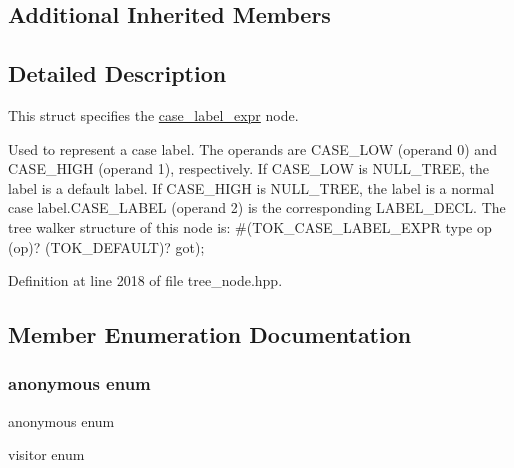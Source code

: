 \subsection*{Additional Inherited Members}


\subsection{Detailed Description}
This struct specifies the \hyperlink{structcase__label__expr}{case\+\_\+label\+\_\+expr} node. 

Used to represent a case label. The operands are C\+A\+S\+E\+\_\+\+L\+OW (operand 0) and C\+A\+S\+E\+\_\+\+H\+I\+GH (operand 1), respectively. If C\+A\+S\+E\+\_\+\+L\+OW is N\+U\+L\+L\+\_\+\+T\+R\+EE, the label is a \textquotesingle{}default\textquotesingle{} label. If C\+A\+S\+E\+\_\+\+H\+I\+GH is N\+U\+L\+L\+\_\+\+T\+R\+EE, the label is a normal case label.\+C\+A\+S\+E\+\_\+\+L\+A\+B\+EL (operand 2) is the corresponding L\+A\+B\+E\+L\+\_\+\+D\+E\+CL. The tree walker structure of this node is\+: \#(T\+O\+K\+\_\+\+C\+A\+S\+E\+\_\+\+L\+A\+B\+E\+L\+\_\+\+E\+X\+PR type op (op)? (T\+O\+K\+\_\+\+D\+E\+F\+A\+U\+LT)? got); 

Definition at line 2018 of file tree\+\_\+node.\+hpp.



\subsection{Member Enumeration Documentation}
\mbox{\label{structcase__label__expr_a159bd29456c8ff7c394bfa8ed53b98e7}} 
\subsubsection{\texorpdfstring{anonymous enum}{anonymous enum}}
{\footnotesize\ttfamily anonymous enum}



visitor enum 

